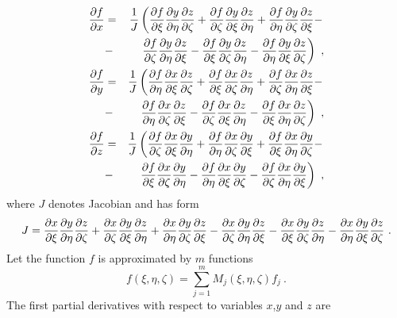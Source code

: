 \begin{eqnarray}
\ppd{f}{x} &=& \del{1}{J}\left(
\ppd{f}{\xi}\ppd{y}{\eta}\ppd{z}{\zeta} + \ppd{f}{\zeta}\ppd{y}{\xi}\ppd{z}{\eta} +
\ppd{f}{\eta}\ppd{y}{\zeta}\ppd{z}{\xi} -\right.
\\
&-& \left.\ppd{f}{\zeta}\ppd{y}{\eta}\ppd{z}{\xi} -
\ppd{f}{\xi}\ppd{y}{\zeta}\ppd{z}{\eta} - \ppd{f}{\eta}\ppd{y}{\xi}\ppd{z}{\zeta}
\right)\ ,
\\
\ppd{f}{y} &=& \del{1}{J}\left(
\ppd{f}{\eta}\ppd{x}{\xi}\ppd{z}{\zeta} + \ppd{f}{\xi}\ppd{x}{\zeta}\ppd{z}{\eta} +
\ppd{f}{\zeta}\ppd{x}{\eta}\ppd{z}{\xi} -\right.
\\
&-& \left.\ppd{f}{\eta}\ppd{x}{\zeta}\ppd{z}{\xi} -
\ppd{f}{\zeta}\ppd{x}{\xi}\ppd{z}{\eta} - \ppd{f}{\xi}\ppd{x}{\eta}\ppd{z}{\zeta}
\right)\ ,
\\
\ppd{f}{z} &=& \del{1}{J}\left(
\ppd{f}{\zeta}\ppd{x}{\xi}\ppd{y}{\eta} + \ppd{f}{\eta}\ppd{x}{\zeta}\ppd{y}{\xi} +
\ppd{f}{\xi}\ppd{x}{\eta}\ppd{y}{\zeta} -\right.
\\
&-& \left.\ppd{f}{\xi}\ppd{x}{\zeta}\ppd{y}{\eta} -
\ppd{f}{\eta}\ppd{x}{\xi}\ppd{y}{\zeta} - \ppd{f}{\zeta}\ppd{x}{\eta}\ppd{y}{\xi}
\right)\ ,
\end{eqnarray}
where $J$ denotes Jacobian and has form
\begin{equation}
J = 
\ppd{x}{\xi}\ppd{y}{\eta}\ppd{z}{\zeta} + \ppd{x}{\zeta}\ppd{y}{\xi}\ppd{z}{\eta} +
\ppd{x}{\eta}\ppd{y}{\zeta}\ppd{z}{\xi} - \ppd{x}{\zeta}\ppd{y}{\eta}\ppd{z}{\xi} -
\ppd{x}{\xi}\ppd{y}{\zeta}\ppd{z}{\eta} - \ppd{x}{\eta}\ppd{y}{\xi}\ppd{z}{\zeta}\ .
\end{equation}
Let the function $f$ is approximated by $m$ functions
\begin{equation}
f(\xi,\eta,\zeta) = \sum_{j=1}^{m} M_j(\xi,\eta,\zeta) f_j\ .
\end{equation}
The first partial derivatives with respect to variables $x$,$y$ and $z$ are
